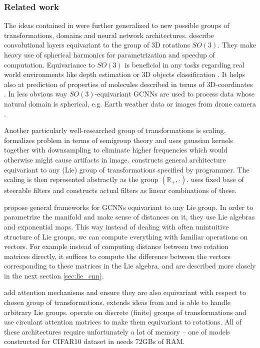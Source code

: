 \subsubsection{Related work}
    The ideas contained in \cite{cohen2016} were further generalized to new
    possible groups of transformations, domains and neural network
    architectures. \cite{cohen_spherical_cnns, kondor_trivedi,
    esteves_so3} describe convolutional layers equivariant to
    the group of 3D rotations $\mathit{SO}(3)$.
    They make heavy use of spherical harmonics for parametrization and
    speedup of computation. Equivariance to $\mathit{SO}(3)$ is beneficial
    in any tasks regarding real world environments like depth estimation or 3D
    objects classification \cite{esteves_so3}. It helps also at
    prediction of properties of
    molecules described in terms of 3D-coordinates \cite{lieconv}.
    In less obvious way
    $\mathit{SO}(3)$-equivariant GCNNs are used to process data whose natural
    domain is spherical, e.g. Earth weather data or images from drone camera
    \cite{cohen_spherical_cnns}.

    Another particularly well-researched group of transformations is scaling.
    \cite{deep_scale_spaces} formalizes problem in terms of semigroup theory and
    uses gaussian kernels together with downsampling to eliminate higher
    frequencies which would otherwise might cause artifacts in image.
    \cite{bekkers2019} constructs general architecture equivariant to any (Lie) group
    of transformations specified by programmer. The scaling is then represented abstractly as
    the group $\left(\mathbb{R}_+,\cdot\right)$. \cite{scale_steerable} uses
    fixed base of steerable filters and constructs actual filters as linear
    combinations of these.


    \cite{bekkers2019, lieconv, lie_transformer} propose general frameworks for
    GCNNs equivariant to any Lie group. In order to parametrize the manifold and
    make sense of distances on it, they use Lie algebras and exponential maps.
    This way
    instead of dealing with often unintuitive structure of Lie groups, we can
    compute everything with familiar operations on vectors. For example
    instead of computing distance between two rotation matrices directly, it
    suffices to compute the difference between the vectors corresponding to
    these matrices in the Lie algebra. \cite{lieconv} and \cite{bekkers2019} are
    described more closely in the next section \ref{sec:lie_cnn}.

    \cite{lie_transformer, attentive_gcnn, coattentive} add attention mechanisms
    and ensure they are also equivariant with respect to chosen group of
    transformations. \cite{lie_transformer} extends ideas from \cite{lieconv}
    and is able to handle arbitrary Lie groups.
    \cite{attentive_gcnn, coattentive} operate on discrete (finite) groups of
    transformations and use circulant attention matrices to make them
    equivariant to rotations. All of these architectures require unfortunately a
    lot of memory -- one of models constructed for CIFAR10 dataset in
    \cite{attentive_gcnn} needs 72GBs of RAM.

